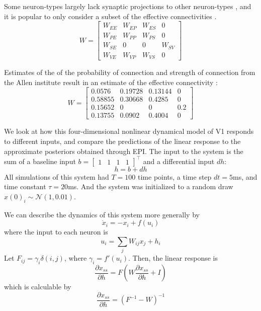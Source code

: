 \documentclass[11pt]{article}
\begin{document}
Some neuron-types largely lack synaptic projections to other neuron-types \cite{pfeffer2013inhibition}, and it is popular to only consider a subset of the effective connectivities \cite{litwin2016inhibitory}.
\begin{equation}
W = \begin{bmatrix} W_{EE} & W_{EP} & W_{ES} & 0 \\
                                W_{PE} & W_{PP} & W_{PS} & 0 \\
                                W_{SE} & 0 & 0 & W_{SV} \\
                                W_{VE} & W_{VP} &  W_{VS} &  0 \end{bmatrix}
\end{equation}

Estimates of the of the probability of connection and strength of connection from the Allen institute result in an estimate of the effective connectivity \cite{allen}: 
\begin{equation}
W = \begin{bmatrix} 0.0576 &  0.19728 & 0.13144 & 0 \\
                                0.58855 & 0.30668 & 0.4285 & 0 \\
                                0.15652 & 0 & 0 & 0.2 \\
                                0.13755 & 0.0902 &  0.4004 &  0 \end{bmatrix}
\end{equation}

We look at how this four-dimensional nonlinear dynamical model of V1 responds to different inputs, and compare the predictions of the linear response to the approximate posteriors obtained through EPI.  The input to the system is the sum of a baseline input $b = \begin{bmatrix} 1 & 1 & 1 & 1 \end{bmatrix}^\top$ and a differential input $dh$:
\begin{equation}
h = b + dh
\end{equation}
All simulations of this system had $T=100$ time points, a time step $dt = 5$ms, and time constant $\tau = 20$ms.  And the system was initialized to a random draw $x(0)_i \sim \mathcal{N}(1, 0.01)$.

We can describe the dynamics of this system more generally by
\begin{equation}
\dot{x}_i = -x_i + f(u_i)
\end{equation}
where the input to each neuron is
\begin{equation}
u_i = \sum_j W_{ij} x_j + h_i
\end{equation}
Let $F_{ij} = \gamma_i \delta(i,j)$, where $\gamma_i = f'(u_i)$.  Then, the linear response is
\begin{equation}
\frac{\partial x_{ss}}{\partial h} = F(W\frac{\partial x_{ss}}{\partial h} + I)
\end{equation}
which is calculable by
\begin{equation}
\frac{\partial x_{ss}}{\partial h} = (F^{-1} - W)^{-1}
\end{equation}
\end{document}
